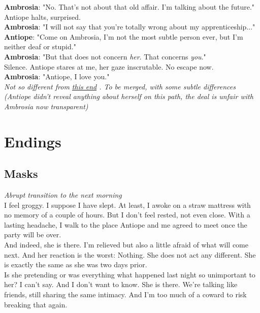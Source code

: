 \documentclass{report}
\newcommand{\dcomment}[1]{
	\emph{#1}
	\\
}
\newcommand{\speaker}[1]{
	\textbf{#1}: 
}
\newcommand{\glink}[2]{
	\hyperref[#1]{#2}
}
\newcommand{\gsection}[1]{
	\section*{#1}
	\label{#1}
}
\begin{document}
\speaker{Ambrosia} "No. That's not about that old affair. I'm talking about the future."\\

Antiope halts, surprised.\\

\speaker{Ambrosia} "I will not say that you're totally wrong about my apprenticeship..."\\

\speaker{Antiope} "Come on Ambrosia, I'm not the most subtle person ever, but I'm neither deaf or stupid."\\

\speaker{Ambrosia} "But that does not concern \emph{her}. That concerns \emph{you}."\\

Silence. Antiope stares at me, her gaze inscrutable. No escape now.\\

\speaker{Ambrosia} "Antiope, I love you."\\

\dcomment{
	Not so different from \glink{Declaration}{this end}. To be merged, with some subtle differences (Antiope didn't reveal anything about herself on this path, the deal is unfair with Ambrosia now transparent)
}

\chapter*{Endings}

\gsection{Masks}

\dcomment{
	Abrupt transition to the next morning
}

I feel groggy. I suppose I have slept. At least, I awoke on a straw mattress with no memory of a couple of hours. But I don't feel rested, not even close. With a lasting headache, I walk to the place Antiope and me agreed to meet once the party will be over.\\

And indeed, she is there. I'm relieved but also a little afraid of what will come next. And her reaction is the worst: Nothing. She does not act any different. She is exactly the same as she was two days prior.\\

Is she pretending or was everything what happened last night so unimportant to her? I can't say. And I don't want to know. She is there. We're talking like friends, still sharing the same intimacy. And I'm too much of a coward to risk breaking that again.\\
\end{document}
